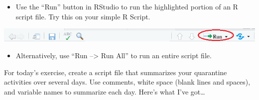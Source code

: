 \documentclass[]{book}
\newenvironment{Shaded}{\begin{snugshade}}{\end{snugshade}}
\newcommand{\CharTok}[1]{\textcolor[rgb]{0.31,0.60,0.02}{#1}}
\newcommand{\CommentTok}[1]{\textcolor[rgb]{0.56,0.35,0.01}{\textit{#1}}}
\newcommand{\KeywordTok}[1]{\textcolor[rgb]{0.13,0.29,0.53}{\textbf{#1}}}
\newcommand{\NormalTok}[1]{#1}
\newcommand{\StringTok}[1]{\textcolor[rgb]{0.31,0.60,0.02}{#1}}
\providecommand{\tightlist}{%
  \setlength{\itemsep}{0pt}\setlength{\parskip}{0pt}}
\begin{document}
\begin{itemize}
\tightlist
\item
  Use the ``Run'' button in RStudio to run the highlighted portion of an R script file. Try this on your simple R Script.
\end{itemize}

\begin{center}\includegraphics[width=0.8\linewidth]{images/rstudio_run_button} \end{center}

\begin{Shaded}
\end{Shaded}

\begin{itemize}
\tightlist
\item
  Alternatively, use ``Run --\textgreater{} Run All'' to run an entire script file.
\end{itemize}

For today's exercise, create a script file that summarizes your quarantine activities over several days. Use comments, white space (blank lines and spaces), and variable names to summarize each day. Here's what I've got\ldots{}
\end{document}
